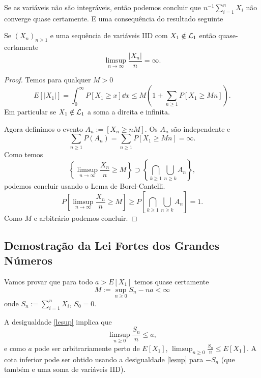  Se as variáveis não são integráveis, então podemos concluir que 
 $n^{-1}\sum_{i=1}^n X_i$ não converge quase certamente. 
 E uma consequência do resultado seguinte
 
 \begin{proposition}
  
 Se $(X_n)_{n\ge 1}$ e uma sequência de variáveis IID com $X_1\notin {\ensuremath{\mathcal L}}_1$ então quase-certamente
 \begin{equation}
  \limsup_{n\to \infty} \frac{|X_n|}{n}=\infty.
 \end{equation}

  
 \end{proposition}
 
 \begin{proof}
 Temos para qualquer $M>0$
 $$E[|X_1|]=\int_0^{\infty} P[X_1\ge x] \dd x \le  M\left(1+ \sum_{n\ge 1} P[X_1\ge Mn]\right).$$
  Em particular se $X_1\notin {\ensuremath{\mathcal L}}_1$ a soma a direita e infinita.
  
  \medskip
  
  Agora definimos o evento $A_n:= [X_n\ge nM]$.  Os $A_n$ são independente e 
 $$\sum_{n\ge 1} P(A_n) = \sum_{n\ge 1} P[X_1\ge Mn]=\infty.$$
 Como temos
 $$ \left\{ \limsup_{n\to \infty} \frac{X_n}{n}\ge M \right\} \supset \left\{  \bigcap_{k\ge 1} \bigcup_{n\ge k} A_n \right\},$$
podemos concluir usando o Lema de Borel-Cantelli.
$$ P\left[ \limsup_{n\to \infty} \frac{X_n}{n}\ge M\right]\ge P \left[ \bigcap_{k\ge 1} \bigcup_{n\ge k} A_n  \right] =1.$$
Como $M$ e arbitrário podemos concluir.

 \end{proof}






\subsection{Demostração da Lei Fortes dos Grandes Números}

Vamos provar que para todo $a>E[X_1]$ temos quase certamente
\begin{equation}\label{lesup}
M:=\sup_{n\ge 0} S_n-n a <\infty
\end{equation}
onde $S_n:=\sum_{i=1}^n X_i$, $S_0=0$.

\medskip

A desigualdade \eqref{lesup} implica que 
\begin{equation*}
 \limsup_{n\ge 0} \frac{S_n}{n}\le a,
\end{equation*}
e como $a$ pode ser arbitrariamente perto de $E[X_1]$,  $\limsup_{n\ge 0} \frac{S_n}{n}\le E[X_1]$.
A cota inferior pode ser obtido usando a desigualdade \eqref{lesup} para $-S_n$ (que também e uma soma de variáveis IID).


